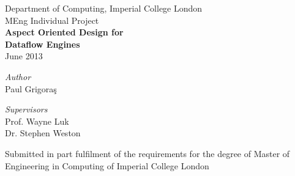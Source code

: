 \begin{titlepage}

\begin{center}

{\Large Department of Computing, Imperial College London}
\HRule \\[0.4cm]
{\Large MEng Individual Project} \\ [5cm]

{\huge \bfseries Aspect Oriented Design for \\[0.25cm]Dataflow Engines}\\[0.5cm]
{\Large June 2013} \\ [3cm]

\begin{minipage}[t]{0.4\textwidth}
\begin{flushleft} \large
\emph{Author} \\[0.5cm]
{Paul Grigora\c{s}} \\[0.5cm]

\end{flushleft}
\end{minipage}
\begin{minipage}[t]{0.4\textwidth}
\begin{flushright} \large
\emph{Supervisors} \\[0.5cm]
Prof. Wayne Luk \\[0.3cm]
Dr. Stephen Weston
\end{flushright}
\end{minipage}

\vfill

\begin{minipage}{0.75\textwidth}
\begin{center}
Submitted in part fulfilment of the requirements for the degree of
Master of Engineering in Computing of Imperial College London
\end{center}
\end{minipage}

\end{center}
\end{titlepage}
